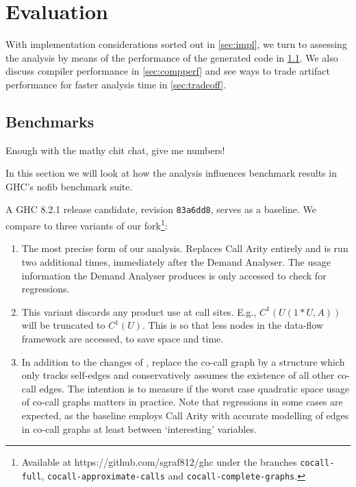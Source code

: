 \chapter{Evaluation}\label{sec:eval}

With implementation considerations sorted out in \cref{sec:impl}, we turn to assessing the analysis by means of the performance of the generated code in \cref{sec:bench}.
We also discuss compiler performance in \cref{sec:compperf} and see ways to trade artifact performance for faster analysis time in \cref{sec:tradeoff}.

\section{Benchmarks}\label{sec:bench}

Enough with the mathy chit chat, give me numbers!

In this section we will look at how the analysis influences benchmark results in GHC's nofib \parencite{nofib} benchmark suite.

A GHC 8.2.1 release candidate, revision \texttt{83a6dd8}, serves as a baseline. We compare to three variants of our fork\footnote{Available at https://github.com/sgraf812/ghc under the branches \texttt{cocall-full}, \texttt{cocall-approximate-calls} and \texttt{cocall-complete-graphs}.}:

\begin{enumerate}
  \item[\varfull] 
    The most precise form of our analysis. 
    Replaces Call Arity entirely and is run two additional times, immediately after the Demand Analyser. 
    The usage information the Demand Analyser produces is only accessed to check for regressions.
  \item[\varcalls]
    This variant discards any product use at call sites. 
    E.g., $C^1(U(1*U,A))$ will be truncated to $C^1(U)$. 
    This is so that less nodes in the data-flow framework are accessed, to save space and time.
  \item[\varedges]
    In addition to the changes of \varcalls, replace the co-call graph by a structure which only tracks self-edges and conservatively assumes the existence of all other co-call edges.
    The intention is to measure if the worst case quadratic space usage of co-call graphs matters in practice.
    Note that regressions in some cases are expected, as the baseline employs Call Arity with accurate modelling of edges in co-call graphs at least between `interesting' variables.
\end{enumerate}


